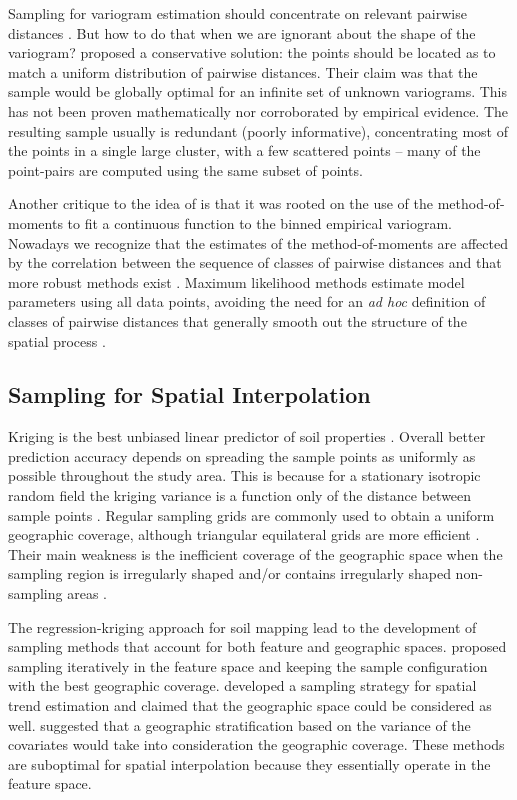 Sampling for variogram estimation should concentrate on relevant pairwise distances \cite{MuellerEtAl1999, 
Lark2002}. But how to do that when we are ignorant about the shape of the variogram? \citet{BreslerEtAl1982, 
Russo1984, WarrickEtAl1987} proposed a conservative solution: the points should be located as to match a 
uniform distribution of pairwise distances. Their claim was that the sample would be globally optimal for an 
infinite set of unknown variograms. This has not been proven mathematically nor corroborated by empirical 
evidence. The resulting sample usually is redundant (poorly informative), concentrating most of the points in a 
single large cluster, with a few scattered points -- many of the point-pairs are computed using the same subset 
of points.

Another critique to the idea of \citet{BreslerEtAl1982, Russo1984, WarrickEtAl1987} is that it was rooted on 
the use of the method-of-moments to fit a continuous function to the binned empirical variogram. Nowadays we 
recognize that the estimates of the method-of-moments are affected by the correlation between the sequence of 
classes of pairwise distances and that more robust methods exist \cite{DiggleEtAl2002}. Maximum likelihood 
methods estimate model parameters using all data points, avoiding the need for an \textit{ad hoc} definition of 
classes of pairwise distances that generally smooth out the structure of the spatial process  
\cite{Lark2000}.

\subsection{Sampling for Spatial Interpolation}

Kriging is the best unbiased linear predictor of soil properties \cite{LarkEtAl2006}. Overall better prediction 
accuracy depends on spreading the sample points as uniformly as possible throughout the study area. This is 
because for a stationary isotropic random field the kriging variance is a function only of the distance between 
sample points \cite{Cressie1993}. Regular sampling grids are commonly used to obtain a uniform geographic 
coverage, although triangular equilateral grids are more efficient \cite{WebsterEtAl2007}. Their main weakness 
is the inefficient coverage of the geographic space when the sampling region is irregularly shaped and/or 
contains irregularly shaped non-sampling areas \cite{WalvoortEtAl2010}.

The regression-kriging approach for soil mapping \cite{HenglEtAl2007b} lead to the development of sampling 
methods that account for both feature and geographic spaces. \citet{HenglEtAl2003a} proposed sampling 
iteratively in the feature space and keeping the sample configuration with the best geographic coverage. 
\citet{MinasnyEtAl2006b} developed a sampling strategy for spatial trend estimation and claimed that the 
geographic space could be considered as well. \citet{MinasnyEtAl2007a} suggested that a geographic 
stratification based on the variance of the covariates would take into consideration the geographic coverage. 
These methods are suboptimal for spatial interpolation because they essentially operate in the feature space.

